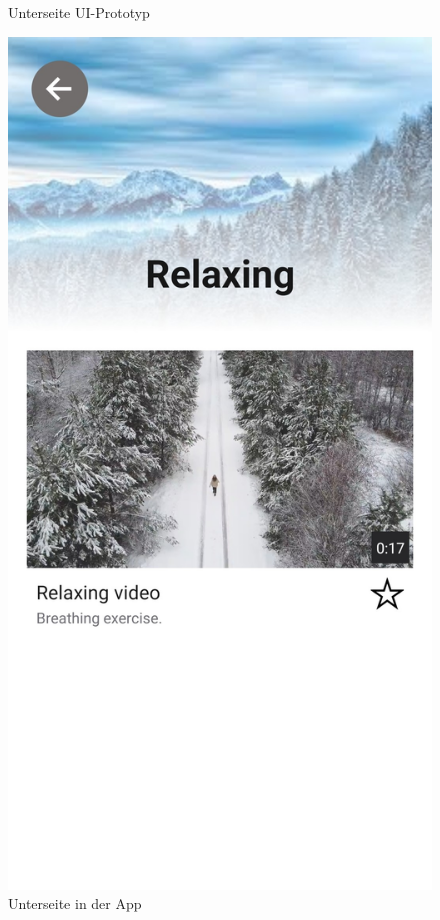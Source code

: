 \begin{figure}[H]
\begin{minipage}{0.5\textwidth}
        \caption{Unterseite UI-Prototyp}
    \end{minipage}
    \begin{minipage}{0.5\textwidth}
        \centering
        \includegraphics[height=2\textwidth]{./pics/Kategorie.jpg}
        \caption{Unterseite in der App}
    \end{minipage}
\end{figure}

